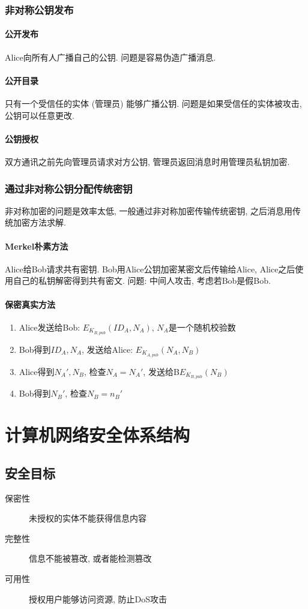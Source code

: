 \documentclass{ctexart}
\begin{document}
\subsubsection{非对称公钥发布}
\paragraph{公开发布} Alice向所有人广播自己的公钥. 问题是容易伪造广播消息.
\paragraph{公开目录} 只有一个受信任的实体 (管理员) 能够广播公钥. 问题是如果受信任的实体被攻击, 公钥可以任意更改.
\paragraph{公钥授权} 双方通讯之前先向管理员请求对方公钥, 管理员返回消息时用管理员私钥加密.
\subsubsection{通过非对称公钥分配传统密钥}
    非对称加密的问题是效率太低, 一般通过非对称加密传输传统密钥, 之后消息用传统加密方法求解.
\paragraph{Merkel朴素方法} Alice给Bob请求共有密钥. Bob用Alice公钥加密某密文后传输给Alice, Alice之后使用自己的私钥解密得到共有密文.
    问题: 中间人攻击, 考虑若Bob是假Bob.
\paragraph{保密真实方法} \begin{enumerate}
        \item Alice发送给Bob: $E_{K_{B, pub}}(ID_A, N_A)$, $N_A$是一个随机校验数
        \item Bob得到$ID_A, N_A$, 发送给Alice: $E_{K_{A, pub}}(N_A, N_B)$
        \item Alice得到$N_A', N_B$, 检查$N_A = N_A'$, 发送给B$E_{K_{B, pub}}(N_B)$
        \item Bob得到$N_B'$, 检查$N_B = n_B'$
    \end{enumerate}


\section{计算机网络安全体系结构}
\subsection{安全目标}
    \begin{description}
        \item[保密性] 未授权的实体不能获得信息内容
        \item[完整性] 信息不能被篡改, 或者能检测篡改
        \item[可用性] 授权用户能够访问资源, 防止DoS攻击
    \end{description}
\end{document}
